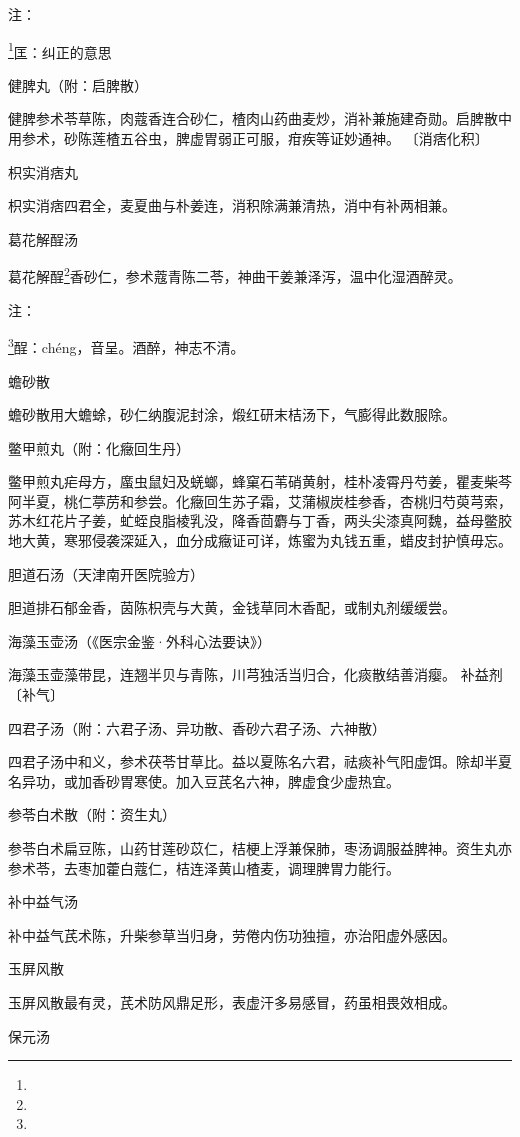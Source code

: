 \documentclass[a4paper,12pt,UTF8,twoside]{ctexbook}
\begin{document}
注：

\footnote{}匡：纠正的意思

健脾丸（附：启脾散）

健脾参术苓草陈，肉蔻香连合砂仁，楂肉山药曲麦炒，消补兼施建奇勋。启脾散中用参术，砂陈莲楂五谷虫，脾虚胃弱正可服，疳疾等证妙通神。
〔消痞化积〕

枳实消痞丸

枳实消痞四君全，麦夏曲与朴姜连，消积除满兼清热，消中有补两相兼。

葛花解酲汤

葛花解酲\footnote{}香砂仁，参术蔻青陈二苓，神曲干姜兼泽泻，温中化湿酒醉灵。

注：

\footnote{}酲：chéng，音呈。酒醉，神志不清。

蟾砂散

蟾砂散用大蟾蜍，砂仁纳腹泥封涂，煅红研末桔汤下，气膨得此数服除。

鳖甲煎丸（附：化癥回生丹）

鳖甲煎丸疟母方，䗪虫鼠妇及蜣螂，蜂窠石苇硝黄射，桂朴凌霄丹芍姜，瞿麦柴芩阿半夏，桃仁葶苈和参尝。化癥回生苏子霜，艾蒲椒炭桂参香，杏桃归芍萸芎索，苏木红花片子姜，虻蛭良脂棱乳没，降香茴麝与丁香，两头尖漆真阿魏，益母鳖胶地大黄，寒邪侵袭深延入，血分成癥证可详，炼蜜为丸钱五重，蜡皮封护慎毋忘。

胆道石汤（天津南开医院验方）

胆道排石郁金香，茵陈枳壳与大黄，金钱草同木香配，或制丸剂缓缓尝。

海藻玉壶汤（《医宗金鉴·外科心法要诀》）

海藻玉壶藻带昆，连翘半贝与青陈，川芎独活当归合，化痰散结善消瘿。
补益剂
〔补气〕

四君子汤（附：六君子汤、异功散、香砂六君子汤、六神散）

四君子汤中和义，参术茯苓甘草比。益以夏陈名六君，祛痰补气阳虚饵。除却半夏名异功，或加香砂胃寒使。加入豆芪名六神，脾虚食少虚热宜。

参苓白术散（附：资生丸）

参苓白术扁豆陈，山药甘莲砂苡仁，桔梗上浮兼保肺，枣汤调服益脾神。资生丸亦参术苓，去枣加藿白蔻仁，桔连泽黄山楂麦，调理脾胃力能行。

补中益气汤

补中益气芪术陈，升柴参草当归身，劳倦内伤功独擅，亦治阳虚外感因。

玉屏风散

玉屏风散最有灵，芪术防风鼎足形，表虚汗多易感冒，药虽相畏效相成。

保元汤
\end{document}
